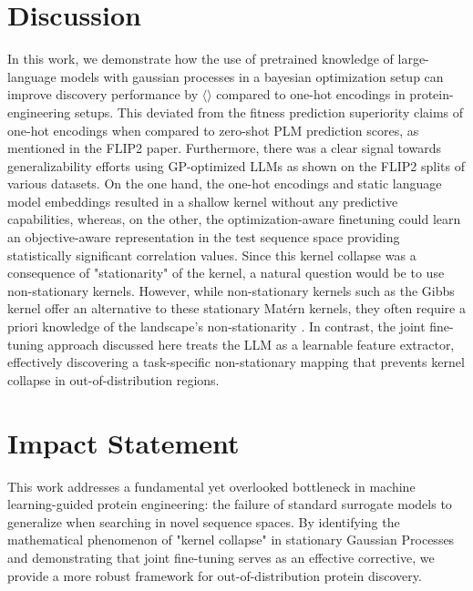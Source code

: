 \documentclass{article}
\theoremstyle{plain}
\theoremstyle{definition}
\theoremstyle{remark}
\begin{document}
\section{Discussion}
In this work, we demonstrate how the use of pretrained knowledge of large-language models with gaussian processes in a bayesian optimization setup can improve discovery performance by $\langle\rangle$ compared to one-hot encodings in protein-engineering setups. This deviated from the fitness prediction superiority claims of one-hot encodings when compared to zero-shot PLM prediction scores, as mentioned in the FLIP2 paper. Furthermore, there was a clear signal towards generalizability efforts using GP-optimized LLMs as shown on the FLIP2 splits of various datasets. On the one hand, the one-hot encodings and static language model embeddings resulted in a shallow kernel without any predictive capabilities, whereas, on the other, the optimization-aware finetuning could learn an objective-aware representation in the test sequence space providing statistically significant correlation values. Since this kernel collapse was a consequence of "stationarity" of the kernel, a natural question would be to use non-stationary kernels. However, while non-stationary kernels such as the Gibbs kernel offer an alternative to these stationary Matérn kernels, they often require a priori knowledge of the landscape's non-stationarity \cite{paciorek2003nonstationary, williams2006gaussian}. In contrast, the joint fine-tuning approach discussed here treats the LLM as a learnable feature extractor, effectively discovering a task-specific non-stationary mapping that prevents kernel collapse in out-of-distribution regions.

\section*{Impact Statement}
This work addresses a fundamental yet overlooked bottleneck in machine learning-guided protein engineering: the failure of standard surrogate models to generalize when searching in novel sequence spaces. By identifying the mathematical phenomenon of "kernel collapse" in stationary Gaussian Processes and demonstrating that joint fine-tuning serves as an effective corrective, we provide a more robust framework for out-of-distribution protein discovery. 




\newpage
\appendix
\onecolumn
\end{document}
